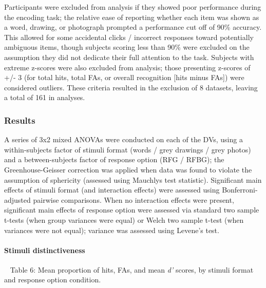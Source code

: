 \documentclass[
  11pt,
]{article}
\begin{document}
Participants were excluded from analysis if they showed poor performance
during the encoding task; the relative ease of reporting whether each
item was shown as a word, drawing, or photograph prompted a performance
cut off of 90\% accuracy. This allowed for some accidental clicks /
incorrect responses toward potentially ambiguous items, though subjects
scoring less than 90\% were excluded on the assumption they did not
dedicate their full attention to the task. Subjects with extreme
z-scores were also excluded from analysis; those presenting z-scores of
+/- 3 (for total hits, total FAs, or overall recognition {[}hits minus
FAs{]}) were considered outliers. These criteria resulted in the
exclusion of 8 datasets, leaving a total of 161 in analyses.

\hypertarget{results-2}{%
\subsubsection{Results}\label{results-2}}

A series of 3x2 mixed ANOVAs were conducted on each of the DVs, using a
within-subjects factor of stimuli format (words / grey drawings / grey
photos) and a between-subjects factor of response option (RFG / RFBG);
the Greenhouse-Geisser correction was applied when data was found to
violate the assumption of sphericity (assessed using Mauchlys test
statistic). Significant main effects of stimuli format (and interaction
effects) were assessed using Bonferroni-adjusted pairwise comparisons.
When no interaction effects were present, significant main effects of
response option were assessed via standard two sample t-tests (when
group variances were equal) or Welch two sample t-test (when variances
were not equal); variance was assessed using Levene's test.

\hypertarget{stimuli-distinctiveness}{%
\paragraph{Stimuli distinctiveness}\label{stimuli-distinctiveness}}

~ Table 6: Mean proportion of hits, FAs, and mean \emph{d'} scores, by
stimuli format and response option condition.
\end{document}
